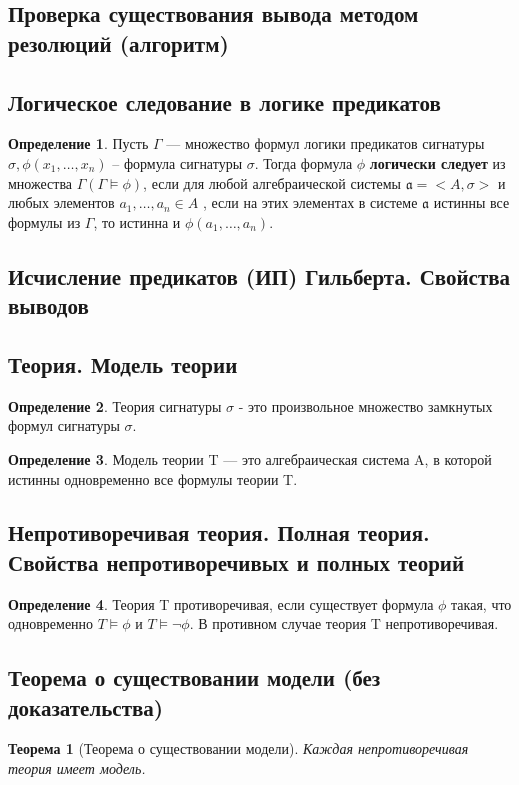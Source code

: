 \documentclass[a4paper]{article}
\newtheorem{theorem}{Теорема}[section]
\theoremstyle{definition}
\newtheorem*{definition}{Определение}
\theoremstyle{remark}
\begin{document}
    \subsection{Проверка существования вывода методом резолюций (алгоритм)}
    \subsection{Логическое следование в логике предикатов}
    \begin{definition}
        Пусть $\Gamma$ — множество формул логики предикатов сигнатуры $\sigma, \phi(x_1, \dots, x_n)$ -- формула 
        сигнатуры $\sigma$. Тогда формула $\phi$ \textbf{логически следует} из множества $\Gamma (\Gamma \models \phi)$, если для любой 
        алгебраической системы $\mathfrak{a} = <A, \sigma>$ и любых элементов $a_1, \dots, a_n \in A$ , если на этих элементах 
        в системе $\mathfrak{a}$ истинны все формулы из $\Gamma$, то истинна и $\phi(a_1, \dots, a_n)$.
    \end{definition}
    \subsection{Исчисление предикатов (ИП)  Гильберта. Свойства выводов}
    \subsection{Теория. Модель теории}
    \begin{definition}
        Теория сигнатуры $\sigma$ - это произвольное множество замкнутых формул сигнатуры  $\sigma$.
    \end{definition}
    \begin{definition}
        Модель теории T — это алгебраическая система A, в которой истинны одновременно все 
    формулы теории T.
    \end{definition}
    \subsection{Непротиворечивая теория. Полная теория. Свойства непротиворечивых и полных теорий}
    \begin{definition}
        Теория T противоречивая, если существует формула $\phi$ такая, что одновременно 
    $T \models \phi$ и $T \models \neg\phi$. В противном случае теория T непротиворечивая.
    \end{definition}
    \subsection{Теорема о существовании модели (без доказательства)}
    \begin{theorem}[Теорема о существовании модели]
        Каждая непротиворечивая теория имеет модель. 
    \end{theorem}
\end{document}

